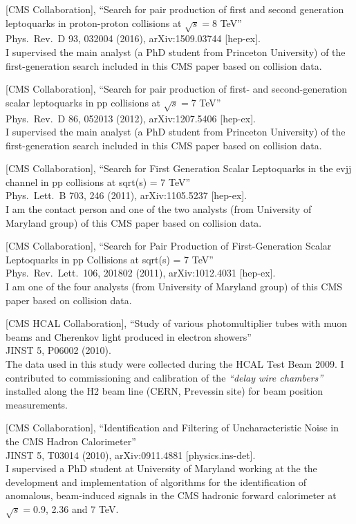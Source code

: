 \documentclass[10pt, a4paper]{article}
\begin{document}
\begin{thebibliography}{599}
[CMS Collaboration],
``Search for pair production of first and second generation
  leptoquarks in proton-proton collisions at $\sqrt{s}=8$ TeV''\\
  Phys.\ Rev.\ D  93, 032004 (2016), arXiv:1509.03744 [hep-ex].
\\I supervised the main analyst (a PhD student from Princeton University) of the first-generation search included in this CMS paper based on collision data. 

[CMS Collaboration],
``Search for pair production of first- and second-generation scalar leptoquarks in pp collisions at $\sqrt{s}= 7$ TeV''\\
Phys.\ Rev.\ D 86, 052013 (2012), arXiv:1207.5406 [hep-ex]. 
\\I supervised the main analyst (a PhD student from Princeton University) of the first-generation search included in this CMS paper based on collision data. 

[CMS Collaboration],
 ``Search for First Generation Scalar Leptoquarks in the evjj channel in pp collisions at sqrt(s) = 7 TeV''\\
  Phys.\ Lett.\ B 703, 246 (2011), arXiv:1105.5237 [hep-ex].
  \\ I am the contact person and one of the two analysts (from University of Maryland group) of this CMS paper based on collision data.

[CMS Collaboration],
``Search for Pair Production of First-Generation Scalar Leptoquarks in pp Collisions at sqrt(s) = 7 TeV''\\
Phys.\ Rev.\ Lett.\  106, 201802 (2011), arXiv:1012.4031 [hep-ex].
\\I am one of the four analysts (from University of Maryland group) of this CMS paper based on collision data.

[CMS HCAL Collaboration],
``Study of various photomultiplier tubes with muon beams and Cherenkov light produced in electron showers''\\
 JINST 5, P06002 (2010).
  \\ The data used in this study were collected during the HCAL Test Beam 2009. I contributed to 
  commissioning and calibration of the {\it ``delay wire chambers''} installed along the H2 
  beam line (CERN, Prevessin site) for beam position measurements.

[CMS Collaboration],
 ``Identification and Filtering of Uncharacteristic Noise in the CMS Hadron Calorimeter''\\
  JINST 5, T03014 (2010), arXiv:0911.4881 [physics.ins-det].\\
I supervised a PhD student at University of Maryland working at the
the development and implementation of algorithms for the
identification of anomalous, beam-induced signals in the CMS hadronic 
forward calorimeter at $\sqrt{s}=$0.9, 2.36 and 7 TeV.


\end{thebibliography}
\end{document}
